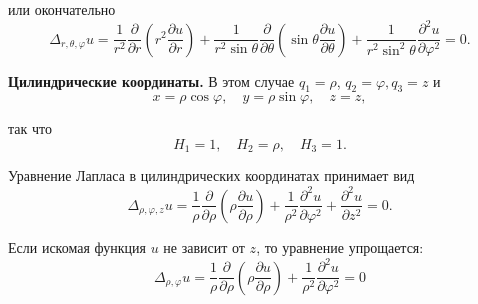 или окончательно
\[
\Delta_{r, \theta, \varphi} u=\frac{1}{r^{2}} \frac{\partial}{\partial r}\left(r^{2} \frac{\partial u}{\partial r}\right)+\frac{1}{r^{2} \sin \theta} \frac{\partial}{\partial \theta}\left(\sin \theta \frac{\partial u}{\partial \theta}\right)+\frac{1}{r^{2} \sin ^{2} \theta} \frac{\partial^{2} u}{\partial \varphi^{2}}=0 .
\]

\textbf{Цилиндрические координаты.} В этом случае $q_{1}=\rho$, $q_{2}=\varphi, q_{3}=z$ и
\[
x=\rho \cos \varphi, \quad y=\rho \sin \varphi, \quad z=z,
\]

так что
\[
H_{1}=1, \quad H_{2}=\rho, \quad H_{3}=1 .
\]

Уравнение Лапласа в цилиндрических координатах принимает вид
\[
\Delta_{\rho, \varphi, z} u=\frac{1}{\rho} \frac{\partial}{\partial \rho}\left(\rho \frac{\partial u}{\partial \rho}\right)+\frac{1}{\rho^{2}} \frac{\partial^{2} u}{\partial \varphi^{2}}+\frac{\partial^{2} u}{\partial z^{2}}=0 .
\]

Если искомая функция $u$ не зависит от $z$, то уравнение упрощается:
\[
\Delta_{\rho, \varphi} u=\frac{1}{\rho} \frac{\partial}{\partial \rho}\left(\rho \frac{\partial u}{\partial \rho}\right)+\frac{1}{\rho^{2}} \frac{\partial^{2} u}{\partial \varphi^{2}}=0
\]